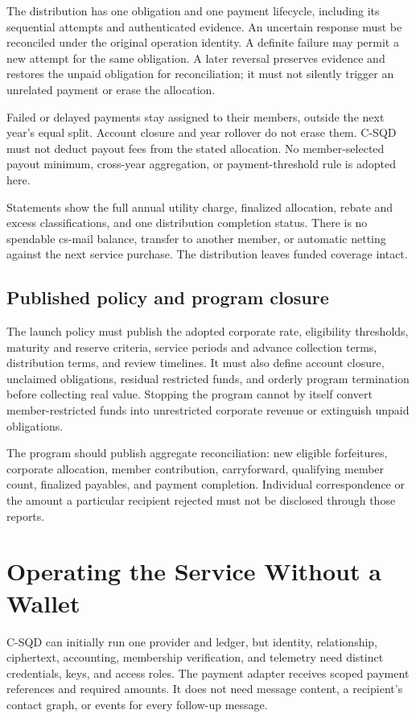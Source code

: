 \documentclass[11pt]{article}
\begin{document}
The distribution has one obligation and one payment lifecycle, including its
sequential attempts and authenticated evidence. An uncertain response must be
reconciled under the original operation identity. A definite failure may permit
a new attempt for the same obligation. A later reversal preserves evidence and
restores the unpaid obligation for reconciliation; it must not silently trigger
an unrelated payment or erase the allocation.

Failed or delayed payments stay assigned to their members, outside the next
year's equal split. Account closure and year rollover do not erase them.
C-SQD must not deduct payout fees from the stated allocation. No member-selected
payout minimum, cross-year aggregation, or payment-threshold rule is adopted here.

Statements show the full annual utility charge, finalized allocation, rebate
and excess classifications, and one distribution completion status. There is
no spendable cs-mail balance, transfer to another member, or automatic netting
against the next service purchase. The distribution leaves funded coverage intact.

\subsection{Published policy and program closure}

The launch policy must publish the adopted corporate rate, eligibility thresholds,
maturity and reserve criteria, service periods and advance collection terms,
distribution terms, and review timelines. It must also define account closure, unclaimed obligations, residual
restricted funds, and orderly program termination before collecting real value.
Stopping the program cannot by itself convert member-restricted funds into
unrestricted corporate revenue or extinguish unpaid obligations.

The program should publish aggregate reconciliation: new eligible forfeitures,
corporate allocation, member contribution, carryforward, qualifying member count,
finalized payables, and payment completion. Individual correspondence or the
amount a particular recipient rejected must not be disclosed through those
reports.

\section{Operating the Service Without a Wallet}

C-SQD can initially run one provider and ledger, but identity, relationship,
ciphertext, accounting, membership verification, and telemetry need distinct
credentials, keys, and access roles. The payment adapter receives scoped payment
references and required amounts. It does not need message content, a recipient's
contact graph, or events for every follow-up message.
\end{document}
